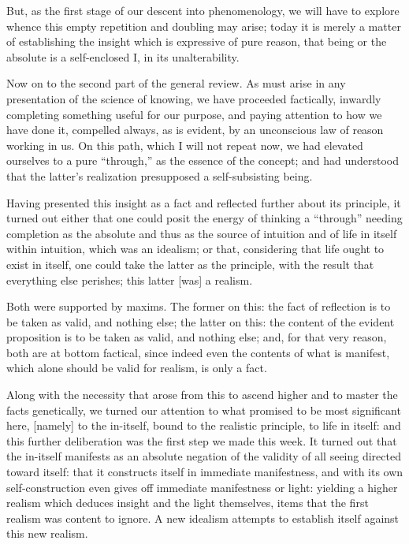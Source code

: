 But, as the first stage of our descent into phenomenology,
we will have to explore whence this
empty repetition and doubling may arise;
today it is merely a matter of establishing the insight
which is expressive of pure reason, that being or the absolute is
a self-enclosed I, in its unalterability.

Now on to the second part of the general review.
As must arise in any presentation of the science of knowing,
we have proceeded factically, inwardly completing
something useful for our purpose,
and paying attention to how we have done it,
compelled always, as is evident, by
an unconscious law of reason working in us.
On this path, which I will not repeat now,
we had elevated ourselves to a pure “through,”
as the essence of the concept;
and had understood that the latter’s realization
presupposed a self-subsisting being.

Having presented this insight as a fact
and reflected further about its principle,
it turned out either that one could posit
the energy of thinking a “through” needing
completion as the absolute
and thus as the source of intuition
and of life in itself within intuition,
which was an idealism;
or that, considering that life ought to exist in itself,
one could take the latter as the principle,
with the result that everything else perishes;
this latter [was] a realism.

Both were supported by maxims.
The former on this: the fact of reflection is
to be taken as valid, and nothing else;
the latter on this:
the content of the evident proposition is
to be taken as valid, and nothing else;
and, for that very reason, both are at bottom factical,
since indeed even the contents of what is manifest,
which alone should be valid for realism, is only a fact.

Along with the necessity that arose from this
to ascend higher and to master the facts genetically,
we turned our attention to what promised to be most significant here,
[namely] to the in-itself, bound to the realistic principle,
to life in itself:
and this further deliberation was the first step we made this week.
It turned out that the in-itself manifests as an absolute
negation of the validity of all seeing directed toward itself:
that it constructs itself in immediate manifestness,
and with its own self-construction even gives
off immediate manifestness or light:
yielding a higher realism which deduces
insight and the light themselves,
items that the first realism was content to ignore.
A new idealism attempts to establish itself
against this new realism.

